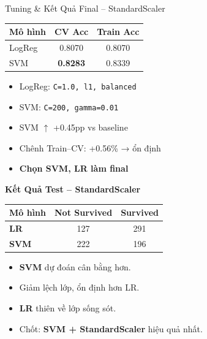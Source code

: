 \documentclass[
	11pt
]{beamer}
\begin{document}
\begin{frame}{Tuning \& Kết Quả Final -- StandardScaler}
	\centering
	
	\begin{tabular}{lcc}
		\toprule
		\textbf{Mô hình} & \textbf{CV Acc} & \textbf{Train Acc} \\
		\midrule
		LogReg  & 0.8070 & 0.8070 \\
		SVM     & \textbf{0.8283} & 0.8339 \\
		\bottomrule
	\end{tabular}
	
	\vspace{0.4em}
	
	\begin{itemize}
		\item LogReg: \texttt{C=1.0, l1, balanced}
		\item SVM: \texttt{C=200, gamma=0.01}
		\item SVM $\uparrow$ +0.45pp vs baseline
		\item Chênh Train–CV: +0.56\% → ổn định
		\item \textbf{Chọn SVM, LR làm final}
	\end{itemize}
\end{frame}




\begin{frame}{\textbf{Kết Quả Test – StandardScaler}}
	
	\centering
	
	\begin{tabular}{lcc}
		\toprule
		\textbf{Mô hình} & \textbf{Not Survived} & \textbf{Survived} \\
		\midrule
		\textbf{LR} & 127 & 291 \\
		\textbf{SVM} & 222 & 196 \\
		\bottomrule
	\end{tabular}
	
	\vspace{0.6em}
	
	\begin{itemize}
		\item \textbf{SVM} dự đoán cân bằng hơn.  
		\item Giảm lệch lớp, ổn định hơn LR.  
		\item \textbf{LR} thiên về lớp sống sót.  
		\item Chốt: \textbf{SVM + StandardScaler} hiệu quả nhất.
	\end{itemize}
	
\end{frame}
\end{document}
